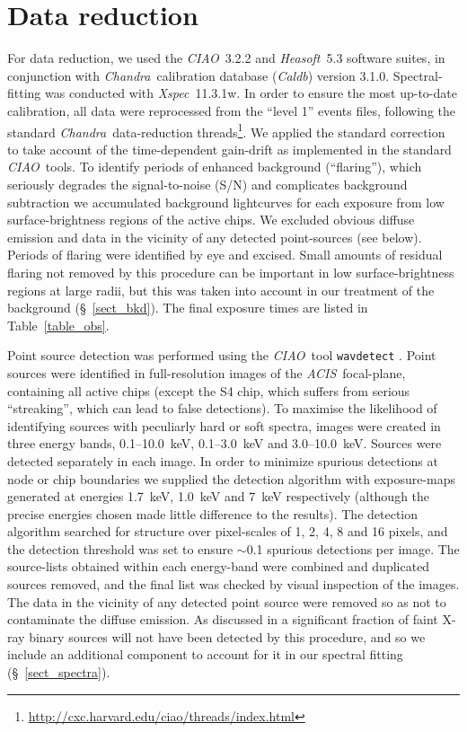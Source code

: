 \documentclass{emulateapj}
\newcommand{\chandra }{{\em Chandra}}
\newcommand{\xspec }{{\em Xspec}}
\newcommand{\acis }{{\em ACIS}}
\newcommand{\ciao }{{\em CIAO}}
\newcommand{\caldb }{{\em Caldb}}
\newcommand{\heasoft }{{\em Heasoft}}
\begin{document}
\section{Data reduction} \label{sect_reduction}
For data reduction, we used the \ciao\ 3.2.2 and \heasoft\ 5.3 software
suites, in conjunction with \chandra\ calibration database (\caldb)
version 3.1.0. Spectral-fitting was conducted with \xspec\ 11.3.1w.
In order to ensure the most up-to-date calibration, all data were 
reprocessed from the ``level 1'' events files, following the standard
\chandra\ data-reduction threads\footnote{\href{http://cxc.harvard.edu/ciao/threads/index.html}{http://cxc.harvard.edu/ciao/threads/index.html}}.
We applied the standard correction to take account of the time-dependent gain-drift 
as implemented in the standard \ciao\ tools. To identify periods of enhanced
background (``flaring''), which seriously degrades the signal-to-noise (S/N)
and complicates background subtraction \citep{markevitch02}
we accumulated background lightcurves for each exposure from
low surface-brightness regions of the active chips. We
excluded obvious diffuse emission and data in the vicinity of any detected
point-sources (see below). Periods of flaring were identified by eye and
excised. Small amounts of residual flaring not removed by this procedure 
can be important in low surface-brightness regions at large radii, 
but this was taken into account in our treatment of the 
background (\S~\ref{sect_bkd}).
The final exposure times are listed in Table~\ref{table_obs}.

Point source detection was performed using the \ciao\ tool
{\tt wavdetect} \citep{freeman02}. Point sources were identified 
in full-resolution images of the \acis\ focal-plane, containing all active
chips (except the S4 chip, which suffers from serious ``streaking'', which can
lead to false detections). To maximise the likelihood of identifying
sources with peculiarly hard or soft spectra, images were created in three
energy bands, 0.1--10.0~keV, 0.1--3.0~keV and 3.0--10.0~keV. Sources were
detected separately in each image. In order to minimize spurious detections at
node or chip boundaries we supplied the detection algorithm with
exposure-maps  generated at
energies 1.7~keV, 1.0~keV and 7~keV respectively (although the precise
energies chosen made little difference to the results). The
detection algorithm searched for structure over pixel-scales of 1, 2, 4, 8 and
16 pixels, and the detection threshold was set to ensure $\sim$0.1 
spurious detections per image.
The source-lists obtained within each energy-band were combined and
duplicated sources removed, and the final list was checked
by visual inspection of the images.
The data in the vicinity of any detected point source
were removed so as not to contaminate the diffuse emission.
As discussed in \citet[][see also \citealt{kim03a}]{humphrey04a}
a significant fraction of faint X-ray binary sources
will not have been detected by this procedure, and so we include
an additional component to account for it in our spectral fitting
(\S~\ref{sect_spectra}).
\end{document}
